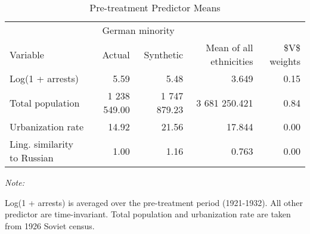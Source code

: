 \begin{table}[!h]

\caption{\label{tab:sc_predictor_means_robustness}Pre-treatment Predictor Means}
\centering
\begin{threeparttable}
\fontsize{10}{12}\selectfont
\begin{tabular}{lrrrr}
\toprule
\multicolumn{1}{c}{ } & \multicolumn{2}{c}{German minority} \\
\cmidrule(l{2pt}r{2pt}){2-3}
Variable & Actual & Synthetic & Mean of all ethnicities & \$V\$ weights\\
\midrule
Log(1 + arrests) & 5.59 & 5.48 & 3.649 & 0.15\\
Total population & 1 238 549.00 & 1 747 879.23 & 3 681 250.421 & 0.84\\
Urbanization rate & 14.92 & 21.56 & 17.844 & 0.00\\
Ling. similarity to Russian & 1.00 & 1.16 & 0.763 & 0.00\\
\bottomrule
\end{tabular}
\begin{tablenotes}
\item \textit{Note: } 
\item Log(1 + arrests) is averaged over the pre-treatment period (1921-1932). All other predictor are time-invariant. Total population and urbanization rate are taken from 1926 Soviet census.
\end{tablenotes}
\end{threeparttable}
\end{table}
